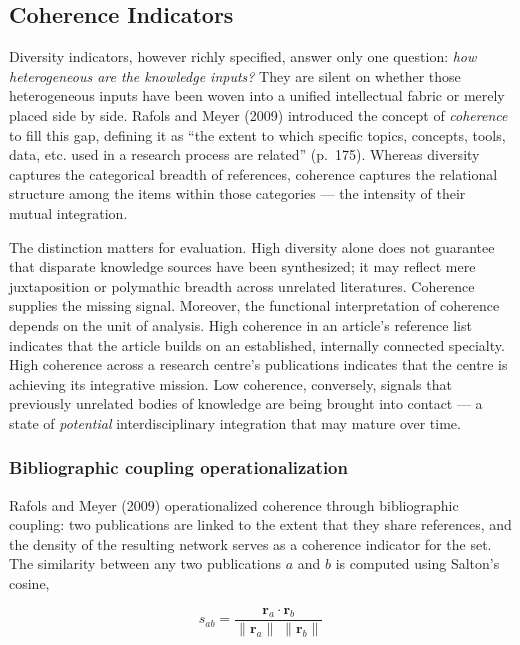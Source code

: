 \documentclass[
]{article}
\begin{document}
\hypertarget{coherence-indicators}{%
\subsection{Coherence Indicators}\label{coherence-indicators}}

Diversity indicators, however richly specified, answer only one
question: \emph{how heterogeneous are the knowledge inputs?} They are
silent on whether those heterogeneous inputs have been woven into a
unified intellectual fabric or merely placed side by side. Rafols and
Meyer (2009) introduced the concept of \emph{coherence} to fill this
gap, defining it as ``the extent to which specific topics, concepts,
tools, data, etc. used in a research process are related'' (p.~175).
Whereas diversity captures the categorical breadth of references,
coherence captures the relational structure among the items within those
categories --- the intensity of their mutual integration.

The distinction matters for evaluation. High diversity alone does not
guarantee that disparate knowledge sources have been synthesized; it may
reflect mere juxtaposition or polymathic breadth across unrelated
literatures. Coherence supplies the missing signal. Moreover, the
functional interpretation of coherence depends on the unit of analysis.
High coherence in an article's reference list indicates that the article
builds on an established, internally connected specialty. High coherence
across a research centre's publications indicates that the centre is
achieving its integrative mission. Low coherence, conversely, signals
that previously unrelated bodies of knowledge are being brought into
contact --- a state of \emph{potential} interdisciplinary integration
that may mature over time.

\hypertarget{bibliographic-coupling-operationalization}{%
\subsubsection{Bibliographic coupling
operationalization}\label{bibliographic-coupling-operationalization}}

Rafols and Meyer (2009) operationalized coherence through bibliographic
coupling: two publications are linked to the extent that they share
references, and the density of the resulting network serves as a
coherence indicator for the set. The similarity between any two
publications \(a\) and \(b\) is computed using Salton's cosine,

\[s_{ab} = \frac{\mathbf{r}_a \cdot \mathbf{r}_b}
               {\|\mathbf{r}_a\|\;\|\mathbf{r}_b\|}\]
\end{document}
